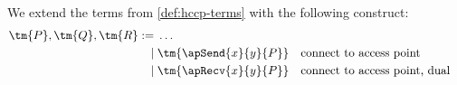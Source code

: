 \begin{definition}[Terms]\label{def:safe-ap-terms}
  We extend the terms from \cref{def:hccp-terms} with the following construct:
  \begin{gather*}
    \begin{aligned}
      \tm{P}, \tm{Q}, \tm{R}
          :=& \; \dots
      \\\mid& \; \tm{\apSend{x}{y}{P}} &&\text{connect to access point}
      \\\mid& \; \tm{\apRecv{x}{y}{P}} &&\text{connect to access point, dual}
    \end{aligned}
  \end{gather*}
\end{definition}
